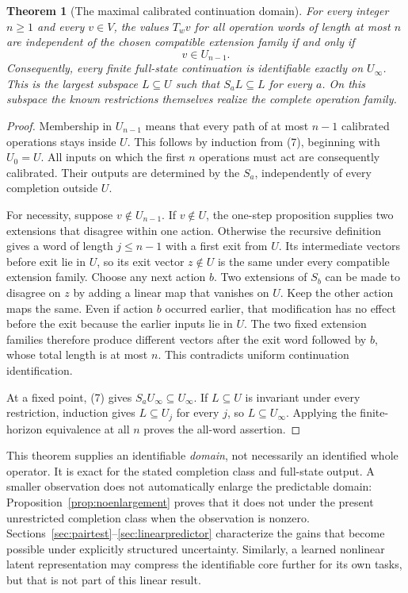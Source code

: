 \documentclass[11pt,letterpaper]{article}
\theoremstyle{plain}
\newtheorem{theorem}{Theorem}[section]
\theoremstyle{definition}
\begin{document}
\begin{theorem}[The maximal calibrated continuation domain]\label{thm:core}
For every integer $n\ge1$ and every $v\in V$, the values $T_wv$ for all operation words of length at most $n$ are independent of the chosen compatible extension family if and only if
\[
v\in U_{n-1}.
\]
Consequently, every finite full-state continuation is identifiable exactly on $U_\infty$. This is the largest subspace $L\subseteq U$ such that $S_aL\subseteq L$ for every $a$. On this subspace the known restrictions themselves realize the complete operation family.
\end{theorem}
\begin{proof}
Membership in $U_{n-1}$ means that every path of at most $n-1$ calibrated operations stays inside $U$. This follows by induction from (7), beginning with $U_0=U$. All inputs on which the first $n$ operations must act are consequently calibrated. Their outputs are determined by the $S_a$, independently of every completion outside $U$.

For necessity, suppose $v\notin U_{n-1}$. If $v\notin U$, the one-step proposition supplies two extensions that disagree within one action. Otherwise the recursive definition gives a word of length $j\le n-1$ with a first exit from $U$. Its intermediate vectors before exit lie in $U$, so its exit vector $z\notin U$ is the same under every compatible extension family. Choose any next action $b$. Two extensions of $S_b$ can be made to disagree on $z$ by adding a linear map that vanishes on $U$. Keep the other action maps the same. Even if action $b$ occurred earlier, that modification has no effect before the exit because the earlier inputs lie in $U$. The two fixed extension families therefore produce different vectors after the exit word followed by $b$, whose total length is at most $n$. This contradicts uniform continuation identification.

At a fixed point, (7) gives $S_aU_\infty\subseteq U_\infty$. If $L\subseteq U$ is invariant under every restriction, induction gives $L\subseteq U_j$ for every $j$, so $L\subseteq U_\infty$. Applying the finite-horizon equivalence at all $n$ proves the all-word assertion.
\end{proof}

This theorem supplies an identifiable \emph{domain}, not necessarily an identified whole operator. It is exact for the stated completion class and full-state output. A smaller observation does not automatically enlarge the predictable domain: Proposition~\ref{prop:noenlargement} proves that it does not under the present unrestricted completion class when the observation is nonzero. Sections~\ref{sec:pairtest}--\ref{sec:linearpredictor} characterize the gains that become possible under explicitly structured uncertainty. Similarly, a learned nonlinear latent representation may compress the identifiable core further for its own tasks, but that is not part of this linear result.
\end{document}
